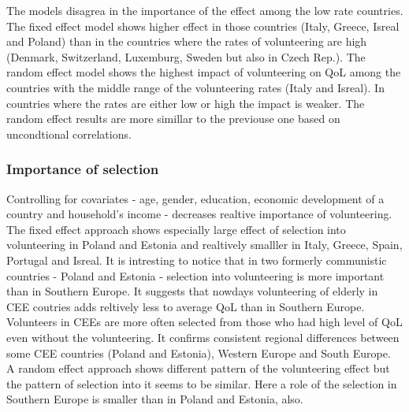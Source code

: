 \documentclass[10pt, letterpaper]{article}
\begin{document}
\begin{spacing}{1.4}
The models disagrea in the importance of the effect among the low rate countries. The fixed effect model shows higher effect in those countries (Italy, Greece, Isreal and Poland) than in the countries where the rates of volunteering are high (Denmark, Switzerland, Luxemburg, Sweden but also in Czech Rep.). The random effect model shows the highest impact of volunteering on QoL among the countries with the middle range of the volunteering rates (Italy and Isreal). In countries where the rates are either low or high the impact is weaker. The random effect results are more simillar to the previouse one based on uncondtional correlations.  \\

\subsubsection*{Importance of selection}

Controlling for covariates - age, gender, education, economic development of a country and household's income - decreases realtive importance of volunteering. The fixed effect approach shows especially large effect of selection into volunteering in Poland and Estonia and realtively smalller in Italy, Greece, Spain, Portugal and Isreal. It is intresting to notice that in two formerly communistic countries - Poland and Estonia - selection into volunteering is more important than in Southern Europe. It suggests that nowdays volunteering  of elderly in CEE coutries adds reltively less to average QoL  than in Southern Europe. Volunteers in CEEs are more often selected from those who had high level of QoL even without the  volunteering. It confirms consistent regional differences between some CEE countries (Poland and Estonia), Western Europe and South Europe.  \\ 

A random effect approach shows different pattern of the volunteering effect but the pattern of selection into it seems to be similar. Here a role of the selection in Southern Europe is smaller than in Poland and Estonia, also. \\

   

\end{spacing}
\end{document}
